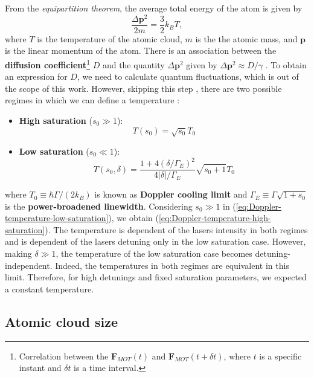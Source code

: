 From the \textit{equipartition theorem}, the average total energy of the atom is given by
\begin{equation}
	\frac{\Delta \mathbf{p}^2}{2m} = \frac{3}{2} k_B T,
\end{equation}
where $ T $ is the temperature of the atomic cloud, $m$ is the the atomic mass, and $ \mathbf{p} $ is the linear momentum of the atom. There is an association between the \textbf{diffusion coefficient}\footnote{Correlation between the $\mathbf{F}_{MOT}(t) $ and $ \mathbf{F}_{MOT}(t + \delta t) $, where $ t $ is a specific instant and $ \delta t $ is a time interval.} $ D $ and the quantity $ \Delta \mathbf{p}^2 $ given by $ \Delta \mathbf{p}^2 \approx D / \gamma $ \cite[Section~2]{perrin2014doppler}. To obtain an expression for $ D $, we need to calculate quantum fluctuations, which is out of the scope of this work. However, skipping this step \cite[Section~2.3]{perrin2014doppler}, there are two possible regimes in which we can define a temperature \cite[Section~V]{loftus2004narrow}:
\begin{itemize}
	\item \textbf{High saturation} ($ s_0 \gg 1 $):
	\begin{equation}
		T(s_0) = \sqrt{s_0} T_0
		\label{eq:Doppler-temperature-high-saturation}
	\end{equation}
	\item \textbf{Low saturation} ($ s_0 \ll 1 $):
	\begin{equation}
		T(s_0, \delta) = \frac{1 + 4(\delta / \Gamma_E)^2}{4|\delta|/\Gamma_E} \sqrt{s_0 + 1} T_0
		\label{eq:Doppler-temperature-low-saturation}
	\end{equation}
\end{itemize}
where $ T_0 \equiv \hbar \Gamma / (2 k_B) $ is known as \textbf{Doppler cooling limit} and $ \Gamma_{E} \equiv \Gamma \sqrt{1 + s_0} $ is the \textbf{power-broadened linewidth}. Considering $ s_0 \gg 1 $ in (\ref{eq:Doppler-temperature-low-saturation}), we obtain (\ref{eq:Doppler-temperature-high-saturation}). The temperature is dependent of the lasers intensity in both regimes and is dependent of the lasers detuning only in the low saturation case. However, making $ \delta \gg 1 $, the temperature of the low saturation case becomes detuning-independent. Indeed, the temperatures in both regimes are equivalent in this limit. Therefore, for high detunings and fixed saturation parameters, we expected a constant temperature.

\subsection{Atomic cloud size}
\label{sec:MOT-cloud-size}

